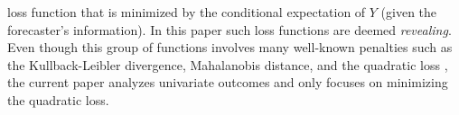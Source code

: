 \documentclass[11pt]{article}
\theoremstyle{definition}
\theoremstyle{definition}
\begin{document}
loss function that is minimized by the conditional expectation of $Y$ (given the forecaster's information). In this paper such loss functions are deemed \textit{revealing}. Even though this group of functions involves many well-known penalties such as the Kullback-Leibler divergence, Mahalanobis distance, and the quadratic loss \citep{banerjee2005optimality}, the current paper analyzes univariate outcomes and only focuses on minimizing the quadratic loss.



\end{document}
